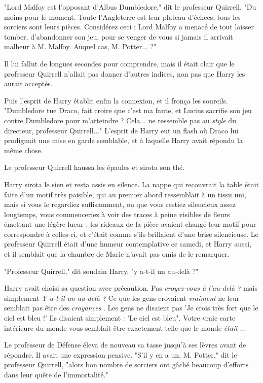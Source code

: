 "Lord Malfoy est l'opposant d'Albus Dumbledore," dit le professeur Quirrell. "Du moins pour le moment. Toute l'Angleterre est leur plateau d'échecs, tous les sorciers sont leurs pièces. Considérez ceci : Lord Malfoy a menacé de tout laisser tomber, d'abandonner son jeu, pour se venger de vous si jamais il arrivait malheur à M. Malfoy. Auquel cas, M. Potter... ?"

Il lui fallut de longues secondes pour comprendre, mais il était clair que le professeur Quirrell n'allait pas donner d'autres indices, non pas que Harry les aurait acceptés.

Puis l'esprit de Harry établit enfin la connexion, et il fronça les sourcils. "Dumbledore tue Draco, fait croire que c'est ma faute, et Lucius sacrifie son jeu contre Dumbledore pour m'atteindre ? Cela... ne ressemble pas au \emph{style}  du directeur, professeur Quirrell..." L'esprit de Harry eut un flash où Draco lui prodiguait une mise en garde semblable, et à laquelle Harry avait répondu la même chose.

Le professeur Quirrell haussa les épaules et sirota son thé.

Harry sirota le sien et resta assis en silence. La nappe qui recouvrait la table était faite d'un motif très paisible, qui au premier abord ressemblait à un tissu uni, mais si vous le regardiez suffisamment, ou que vous restiez silencieux assez longtemps, vous commenceriez à voir des traces à peine visibles de fleurs émettant une légère lueur ; les rideaux de la pièce avaient changé leur motif pour correspondre à celles-ci, et c'était comme s'ils brillaient d'une brise silencieuse. Le professeur Quirrell était d'une humeur contemplative ce samedi, et Harry aussi, et il semblait que la chambre de Marie n'avait pas omis de le remarquer.

"Professeur Quirrell," dit soudain Harry, "y a-t-il un au-delà ?"

Harry avait choisi sa question avec précaution. Pas \emph{croyez-vous à l'au-delà ?}  mais simplement \emph{Y a-t-il un au-delà ?}  Ce que les gens croyaient \emph{vraiment}  ne leur semblait pas être des \emph{croyances} . Les gens ne disaient pas 'Je crois très fort que le ciel est bleu !' Ils disaient simplement : 'Le ciel est bleu". Votre vraie carte intérieure du monde vous semblait être exactement telle que le monde \emph{était} ...

Le professeur de Défense éleva de nouveau sa tasse jusqu'à ses lèvres avant de répondre. Il avait une expression pensive. "S'il y en a un, M. Potter," dit le professeur Quirrell, "alors bon nombre de sorciers ont gâché beaucoup d'efforts dans leur quête de l'immortalité."

